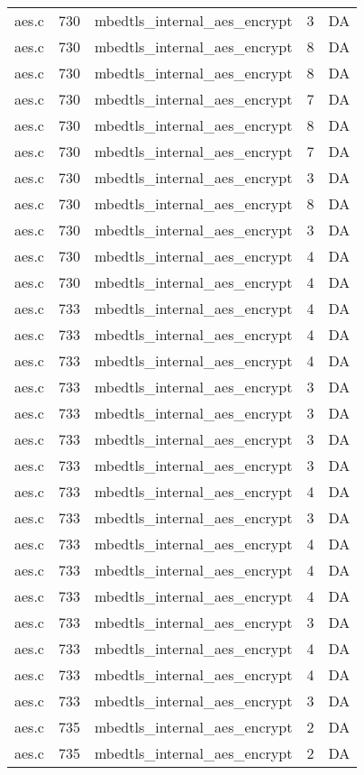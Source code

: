 \begin{table}[h]
{\begin{tabular}{clrrr}
aes.c&730&mbedtls\_internal\_aes\_encrypt&3 &DA\\
aes.c&730&mbedtls\_internal\_aes\_encrypt&8 &DA\\
aes.c&730&mbedtls\_internal\_aes\_encrypt&8 &DA\\
aes.c&730&mbedtls\_internal\_aes\_encrypt&7 &DA\\
aes.c&730&mbedtls\_internal\_aes\_encrypt&8 &DA\\
aes.c&730&mbedtls\_internal\_aes\_encrypt&7 &DA\\
aes.c&730&mbedtls\_internal\_aes\_encrypt&3 &DA\\
aes.c&730&mbedtls\_internal\_aes\_encrypt&8 &DA\\
aes.c&730&mbedtls\_internal\_aes\_encrypt&3 &DA\\
aes.c&730&mbedtls\_internal\_aes\_encrypt&4 &DA\\
aes.c&730&mbedtls\_internal\_aes\_encrypt&4 &DA\\
aes.c&733&mbedtls\_internal\_aes\_encrypt&4 &DA\\
aes.c&733&mbedtls\_internal\_aes\_encrypt&4 &DA\\
aes.c&733&mbedtls\_internal\_aes\_encrypt&4 &DA\\
aes.c&733&mbedtls\_internal\_aes\_encrypt&3 &DA\\
aes.c&733&mbedtls\_internal\_aes\_encrypt&3 &DA\\
aes.c&733&mbedtls\_internal\_aes\_encrypt&3 &DA\\
aes.c&733&mbedtls\_internal\_aes\_encrypt&3 &DA\\
aes.c&733&mbedtls\_internal\_aes\_encrypt&4 &DA\\
aes.c&733&mbedtls\_internal\_aes\_encrypt&3 &DA\\
aes.c&733&mbedtls\_internal\_aes\_encrypt&4 &DA\\
aes.c&733&mbedtls\_internal\_aes\_encrypt&4 &DA\\
aes.c&733&mbedtls\_internal\_aes\_encrypt&4 &DA\\
aes.c&733&mbedtls\_internal\_aes\_encrypt&3 &DA\\
aes.c&733&mbedtls\_internal\_aes\_encrypt&4 &DA\\
aes.c&733&mbedtls\_internal\_aes\_encrypt&4 &DA\\
aes.c&733&mbedtls\_internal\_aes\_encrypt&3 &DA\\
aes.c&735&mbedtls\_internal\_aes\_encrypt&2 &DA\\
aes.c&735&mbedtls\_internal\_aes\_encrypt&2 &DA\\

\end{tabular}}
\end{table}
